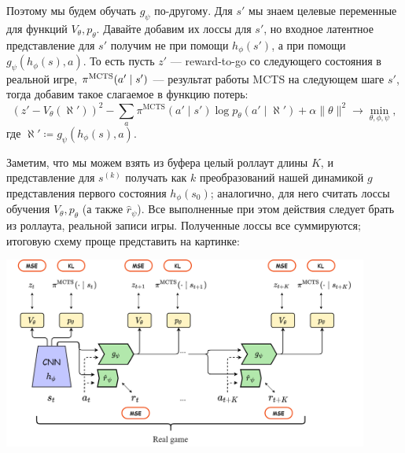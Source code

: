 Поэтому мы будем обучать $g_{\psi}$ по-другому. Для $s'$ мы знаем целевые переменные для функций $V_\theta, p_\theta$. Давайте добавим их лоссы для $s'$, но входное латентное представление для $s'$ получим не при помощи $h_{\phi}(s')$, а при помощи $g_{\psi}(h_{\phi}(s), a)$. То есть пусть $z'$ --- reward-to-go со следующего состояния в реальной игре, $\pi^{\mathrm{MCTS}}(a' \HM\mid s')$ --- результат работы MCTS на следующем шаге $s'$, тогда добавим такое слагаемое в функцию потерь:
\begin{equation}\label{muzero}
(z' - V_\theta(\aleph'))^2 - \sum_a \pi^{\mathrm{MCTS}}(a' \mid s') \log p_\theta(a' \mid \aleph') + \alpha \| \theta \|^2 \to \min_{\theta, \phi, \psi},
\end{equation}
где $\aleph' \coloneqq g_{\psi}(h_{\phi}(s), a)$.

Заметим, что мы можем взять из буфера целый роллаут длины $K$, и представление для $s^{(k)}$ получать как $k$ преобразований нашей динамикой $g$ представления первого состояния $h_{\phi}(s_0)$; аналогично, для него считать лоссы обучения $V_\theta, p_\theta$ (а также $\hat{r}_{\psi}$). Все выполненные при этом действия следует брать из роллаута, реальной записи игры. Полученные лоссы все суммируются; итоговую схему проще представить на картинке:
\begin{center}
    \includegraphics[width=0.9\textwidth]{Images/MuZero.png}
\end{center}

